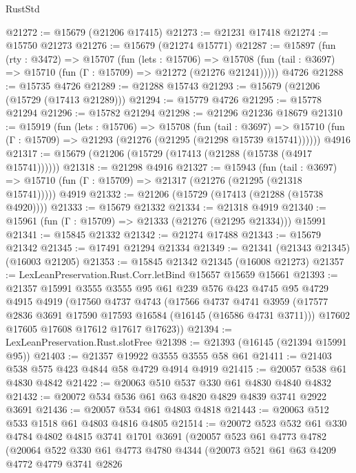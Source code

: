 \begin{lexlean}{RustStd}
\begin{coremodule}
@21272 := @15679 (@21206 @17415)
@21273 := @21231 @17418
@21274 := @15750 @21273
@21276 := @15679 (@21274 @15771)
@21287 := @15897
    (fun (rty : @3472) =>
    @15707
      (fun (lets : @15706) =>
      @15708 (fun (tail : @3697) => @15710 (fun (Γ : @15709) => @21272 (@21276 @21241)))))
    @4726
@21288 := @15735 @4726
@21289 := @21288 @15743
@21293 := @15679 (@21206 (@15729 (@17413 @21289)))
@21294 := @15779 @4726
@21295 := @15778 @21294
@21296 := @15782 @21294
@21298 := @21296 @21236 @18679
@21310 := @15919
    (fun (lets : @15706) =>
    @15708
      (fun (tail : @3697) =>
      @15710 (fun (Γ : @15709) => @21293 (@21276 (@21295 (@21298 @15739 @15741))))))
    @4916
@21317 := @15679 (@21206 (@15729 (@17413 (@21288 (@15738 (@4917 @15741))))))
@21318 := @21298 @4916
@21327 := @15943
    (fun (tail : @3697) => @15710 (fun (Γ : @15709) => @21317 (@21276 (@21295 (@21318 @15741)))))
    @4919
@21332 := @21206 (@15729 (@17413 (@21288 (@15738 @4920))))
@21333 := @15679 @21332
@21334 := @21318 @4919
@21340 := @15961 (fun (Γ : @15709) => @21333 (@21276 (@21295 @21334))) @15991
@21341 := @15845 @21332
@21342 := @21274 @17488
@21343 := @15679 @21342
@21345 := @17491 @21294 @21334
@21349 := @21341 (@21343 @21345) (@16003 @21205)
@21353 := @15845 @21342 @21345 (@16008 @21273)
@21357 := LexLeanPreservation.Rust.Corr.letBind @15657 @15659 @15661
@21393 := @21357
    @15991
    @3555
    @3555
    @95
    @61
    @239
    @576
    @423
    @4745
    @95
    @4729
    @4915
    @4919
    (@17560
      @4737
      @4743
      (@17566
        @4737
        @4741
        @3959
        (@17577 @2836 @3691 @17590 @17593 @16584 (@16145 (@16586 @4731 @3711)))
        @17602
        @17605
        @17608
        @17612
        @17617
        @17623))
@21394 := LexLeanPreservation.Rust.slotFree
@21398 := @21393 (@16145 (@21394 @15991 @95))
@21403 := @21357 @19922 @3555 @3555 @58 @61
@21411 := @21403 @538 @575 @423 @4844 @58 @4729 @4914 @4919
@21415 := @20057 @538 @61 @4830 @4842
@21422 := @20063 @510 @537 @330 @61 @4830 @4840 @4832
@21432 := @20072 @534 @536 @61 @63 @4820 @4829 @4839 @3741 @2922 @3691
@21436 := @20057 @534 @61 @4803 @4818
@21443 := @20063 @512 @533 @1518 @61 @4803 @4816 @4805
@21514 := @20072
    @523
    @532
    @61
    @330
    @4784
    @4802
    @4815
    @3741
    @1701
    @3691
    (@20057
      @523
      @61
      @4773
      @4782
      (@20064
        @522
        @330
        @61
        @4773
        @4780
        @4344
        (@20073
          @521
          @61
          @63
          @4209
          @4772
          @4779
          @3741
          @2826

\end{coremodule}
\end{lexlean}
